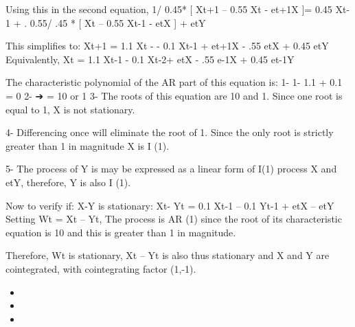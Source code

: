 Using this in the second equation,
1/ 0.45* [ Xt+1 – 0.55 Xt - et+1X ]= 0.45 Xt-1 + . 0.55/ .45 * [ Xt – 0.55 Xt-1 - etX ] + etY

This simplifies to:
Xt+1 = 1.1 Xt - - 0.1 Xt-1 + et+1X - .55 etX + 0.45 etY
Equivalently,
Xt = 1.1 Xt-1 - 0.1 Xt-2+ etX - .55 e-1X + 0.45 et-1Y

The characteristic polynomial of the AR part of this equation is:
1- 1- 1.1 \lambda + 0.1  = 0
2- ➔ \lambda = 10 or 1
3- The roots of this equation are 10 and 1. Since one root is equal to 1, X is not stationary.

4- Differencing once will eliminate the root of 1. Since the only root is strictly greater than 1 in magnitude X is I (1).

5- The process of Y is may be expressed as a linear form of I(1) process X and etY, therefore, Y is also I (1).

Now to verify if: X-Y is stationary:
Xt- Yt = 0.1 Xt-1 – 0.1 Yt-1 + etX – etY
Setting Wt = Xt – Yt,
The process is AR (1) since the root of its characteristic equation is 10 and this is greater than 1 in magnitude.

Therefore, Wt is stationary, Xt – Yt is also thus stationary and X and Y are cointegrated, with cointegrating factor (1,-1).

\begin{itemize}
\item 
\item 
\item 
\end{itemize}
